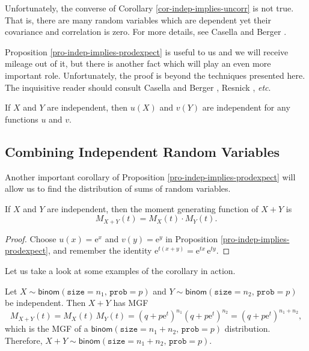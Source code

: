 \documentclass[captions=tableheading]{scrbook}
\begin{document}
\begin{rem}
Unfortunately, the converse of Corollary \ref{cor-indep-implies-uncorr} is not true. That is, there are many random variables which are dependent yet their covariance and correlation is zero. For more details, see Casella and Berger \cite{Casella2002}.
\end{rem}

Proposition \ref{pro-indep-implies-prodexpect} is useful to us and we will receive mileage out of it, but there is another fact which will play an even more important role. Unfortunately, the proof is beyond the techniques presented here. The inquisitive reader should consult Casella and Berger \cite{Casella2002}, Resnick \cite{Resnick1999}, \emph{etc}.

\begin{fact}
If \(X\) and \(Y\) are independent, then \(u(X)\) and \(v(Y)\) are independent for any functions \(u\) and \(v\).
\end{fact}
\subsection{Combining Independent Random Variables}
\label{sec-7-4-2}
\label{sub-Combining-Independent-Random}


Another important corollary of Proposition \ref{pro-indep-implies-prodexpect} will allow us to find the distribution of sums of random variables. 

\begin{cor}
If \(X\) and \(Y\) are independent, then the moment generating function of \(X+Y\) is 
\begin{equation}
M_{X+Y}(t)=M_{X}(t)\cdot M_{Y}(t).
\end{equation}
\end{cor}

\begin{proof}
Choose \(u(x)=\mathrm{e}^{x}\) and \(v(y)=\mathrm{e}^{y}\) in Proposition \ref{pro-indep-implies-prodexpect}, and remember the identity \(\mathrm{e}^{t(x+y)}=\mathrm{e}^{tx}\,\mathrm{e}^{ty}\).
\end{proof}

Let us take a look at some examples of the corollary in action.

\begin{example}
Let \(X\sim\mathsf{binom}(\mathtt{size}=n_{1},\,\mathtt{prob}=p)\) and \(Y\sim\mathsf{binom}(\mathtt{size}=n_{2},\,\mathtt{prob}=p)\) be independent. Then \(X+Y\) has MGF
\[
M_{X+Y}(t)=M_{X}(t)\, M_{Y}(t)=\left(q+p\mathrm{e}^{t}\right)^{n_{1}}\left(q+p\mathrm{e}^{t}\right)^{n_{2}}=\left(q+p\mathrm{e}^{t}\right)^{n_{1}+n_{2}},
\]
which is the MGF of a \(\mathsf{binom}(\mathtt{size}=n_{1}+n_{2},\,\mathtt{prob}=p)\) distribution. Therefore, \(X+Y\sim\mathsf{binom}(\mathtt{size}=n_{1}+n_{2},\,\mathtt{prob}=p)\).
\end{example}
\end{document}
